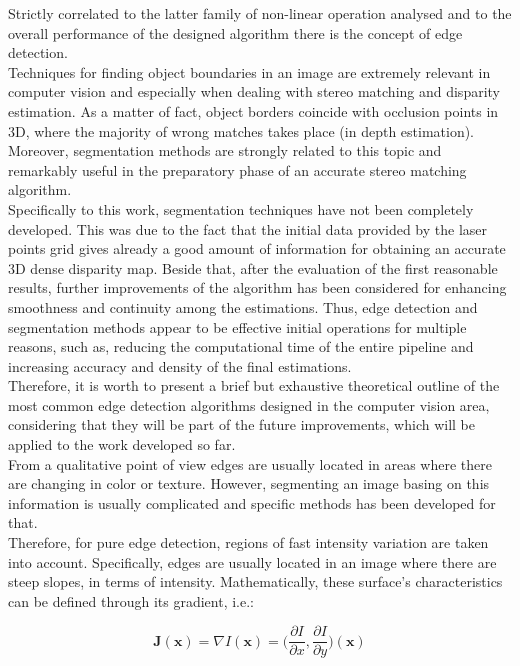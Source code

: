 Strictly correlated to the latter family of non-linear operation analysed and to the overall performance of the designed algorithm there is the concept of edge detection.\\
Techniques for finding object boundaries in an image are extremely relevant in computer vision and especially when dealing with stereo matching and disparity estimation. 
As a matter of fact, object borders coincide with occlusion points in 3D, where the majority of wrong matches takes place (in depth estimation). 
Moreover, segmentation methods are strongly related to this topic and remarkably useful in the preparatory phase of an accurate stereo matching algorithm.\\
Specifically to this work, segmentation techniques have not been completely developed.
This was due to the fact that the initial data provided by the laser points grid gives already a good amount of information for obtaining an accurate 3D dense disparity map.
Beside that, after the evaluation of the first reasonable results, further improvements of the algorithm has been considered for enhancing smoothness and continuity among the estimations.
Thus, edge detection and segmentation methods appear to be effective initial operations for multiple reasons, such as, reducing the computational time of the entire pipeline and increasing accuracy and density of the final estimations.\\
Therefore, it is worth to present a brief but exhaustive theoretical outline of the most common edge detection algorithms designed in the computer vision area, considering that they will be part of the future improvements, which will be applied to the work developed so far. \\
From a qualitative point of view edges are usually located in areas where there are changing in color or texture.
However, segmenting an image basing on this information is usually complicated and specific methods has been developed for that.\\
Therefore, for pure edge detection, regions of fast intensity variation are taken into account.
Specifically, edges are usually located in an image where there are steep slopes, in terms of intensity.
Mathematically, these surface's characteristics can be defined through its gradient, i.e.:

\begin{equation}
	\label{eqn:gradient}
	\mathbf{J}(\mathbf{x}) = \nabla I(\mathbf{x}) = \Big( \frac{\partial I}{\partial x} , \frac{\partial I}{\partial y} \Big) (\mathbf{x})
\end{equation} 

